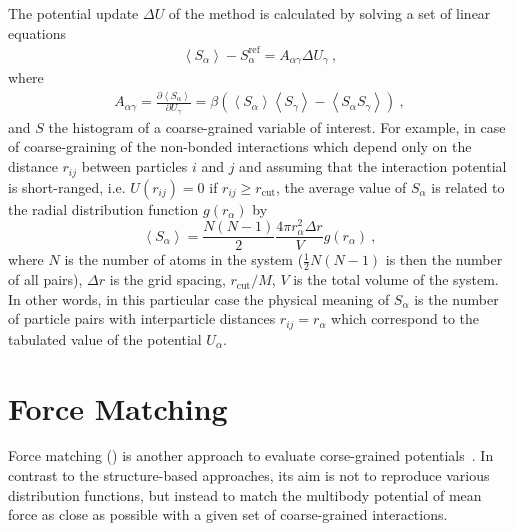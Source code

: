 The potential update $\Delta U$ of the \imc method is calculated by solving a set of linear equations
\begin{align}
    \left<S_{\alpha}\right> - S_{\alpha}^{\text{ref}}= A_{\alpha \gamma} \Delta U_{\gamma}~,
  \label{eq:imc}
\end{align}
%
where
\begin{eqnarray}
  \label{eq:covariance}
  A_{\alpha \gamma} = \frac{\partial \left< S_{\alpha} \right> }{\partial U_{\gamma}}  =
  \beta \left( \left<S_{\alpha} \right>\left<S_{\gamma} \right> - \left<S_{\alpha} S_{\gamma} \right>  \right)~,
  \nonumber
\end{eqnarray}
and $S$ the histogram of a coarse-grained variable of interest. For example, in case of coarse-graining of the non-bonded interactions which depend only on the distance $r_{ij}$ between particles $i$ and $j$ and assuming that the interaction potential is short-ranged, i.e. $U(r_{ij})=0$ if $r_{ij} \ge r_{\text{cut} }$, the average value of $S_{\alpha}$ is related to the radial distribution function $g(r_{\alpha})$ by
%
\begin{equation}
   \left< S_{\alpha} \right> =  \frac{N(N-1)}{2} \frac{4 \pi r_{\alpha}^2 \Delta r} {V}g(r_{\alpha})~,
  \label{eq:s_mean}
\end{equation}
%
where $N$ is the number of atoms in the system ($\frac{1}{2} N(N-1)$ is then the number of all pairs), $\Delta r$ is the grid spacing, $r_{\text{cut}}/M$, $V$ is the total volume of the system. In other words, in this particular case the physical meaning of $S_{\alpha}$ is the number of particle pairs with interparticle distances $r_{ij} = r_{\alpha}$ which correspond to the tabulated value of the potential $U_{\alpha}$.


\section{Force Matching}
\label{sec:fm}



Force matching (\fm) is another approach to evaluate corse-grained potentials~\cite{Ercolessi:1994,Izvekov:2005,Noid:2007}. In contrast to the structure-based approaches, its aim is not to reproduce various distribution functions, but instead to match the multibody potential of mean force as close as possible with a given set of coarse-grained interactions.

